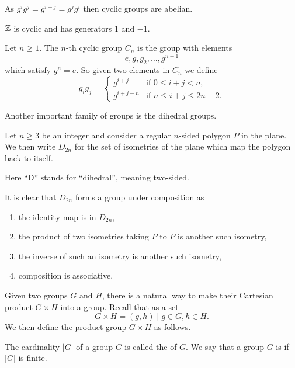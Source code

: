 As $g^ig^j=g^{i+j}=g^jg^i$ then cyclic groups are abelian.

\begin{example}
$\mathbb Z$ is cyclic and has generators $1$ and $-1$.
\end{example}

\begin{example}
Let $n\ge1$. The $n$-th cyclic group $C_n$ is the group with elements
\[ e, g, g_2, \dots, g^{n-1} \]
which satisfy $g^n=e$. So given two elements in $C_n$ we define
\[ g_ig_j=\begin{cases}
g^{i+j} & \text{if } 0\le i+j<n, \\
g^{i+j-n} & \text{if } n\le i+j\le 2n-2.
\end{cases} \]
\end{example}

Another important family of groups is the dihedral groups.

\begin{definition}
Let $n\ge3$ be an integer and consider a regular $n$-sided polygon $P$ in the plane. We then write $D_{2n}$ for the set of isometries of the plane which map the polygon back to itself.
\end{definition}

\begin{remark}
Here ``D'' stands for ``dihedral'', meaning two-sided.
\end{remark}

It is clear that $D_{2n}$ forms a group under composition as
\begin{enumerate}[label=(\roman*)]
\item the identity map is in $D_{2n}$,
\item the product of two isometries taking $P$ to $P$ is another such isometry,
\item the inverse of such an isometry is another such isometry,
\item composition is associative.
\end{enumerate}

Given two groups $G$ and $H$, there is a natural way to make their Cartesian product $G \times H$ into a group. Recall that as a set 
\[ G \times H = {(g,h)\mid g\in G, h\in H}. \]
We then define the product group $G\times H$ as follows.



\begin{definition}
The cardinality $|G|$ of a group $G$ is called the  of $G$. We say that a group $G$ is  if $|G|$ is finite.
\end{definition}



